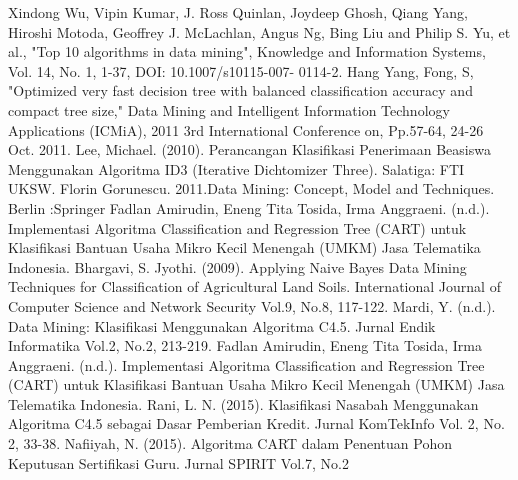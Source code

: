 \documentclass[conference]{IEEEtran}
\begin{document}
\begin{thebibliography}{00}
  Xindong Wu, Vipin Kumar, J. Ross Quinlan, Joydeep Ghosh, Qiang Yang, Hiroshi Motoda, Geoffrey J. McLachlan, Angus Ng, Bing Liu and Philip S. Yu, et al., "Top 10 algorithms in data mining", Knowledge and Information Systems, Vol. 14, No. 1, 1-37, DOI: 10.1007/s10115-007- 0114-2.
 Hang Yang, Fong, S, "Optimized very fast decision tree with balanced classification accuracy and compact tree size," Data Mining and Intelligent Information Technology Applications (ICMiA), 2011 3rd International Conference on, Pp.57-64, 24-26 Oct. 2011.
 Lee, Michael. (2010). Perancangan Klasifikasi Penerimaan Beasiswa Menggunakan Algoritma ID3 (Iterative Dichtomizer Three). Salatiga: FTI UKSW.
 Florin Gorunescu. 2011.Data Mining: Concept, Model and Techniques. Berlin :Springer
 Fadlan Amirudin, Eneng Tita Tosida, Irma Anggraeni. (n.d.). Implementasi Algoritma Classification and Regression Tree (CART) untuk Klasifikasi Bantuan Usaha Mikro Kecil Menengah (UMKM) Jasa Telematika Indonesia.
 Bhargavi, S. Jyothi. (2009). Applying Naive Bayes Data Mining Techniques for Classification of Agricultural Land Soils. International Journal of Computer Science and Network Security Vol.9, No.8, 117-122.
 Mardi, Y. (n.d.). Data Mining: Klasifikasi Menggunakan Algoritma C4.5. Jurnal Endik Informatika Vol.2, No.2, 213-219.
 Fadlan Amirudin, Eneng Tita Tosida, Irma Anggraeni. (n.d.). Implementasi Algoritma Classification and Regression Tree (CART) untuk Klasifikasi Bantuan Usaha Mikro Kecil Menengah (UMKM) Jasa Telematika Indonesia.
 Rani, L. N. (2015). Klasifikasi Nasabah Menggunakan Algoritma C4.5 sebagai Dasar Pemberian Kredit. Jurnal KomTekInfo Vol. 2, No. 2, 33-38.
 Nafiiyah, N. (2015). Algoritma CART dalam Penentuan Pohon Keputusan Sertifikasi Guru. Jurnal SPIRIT Vol.7, No.2
\end{thebibliography}
\vspace{12pt}
\end{document}
